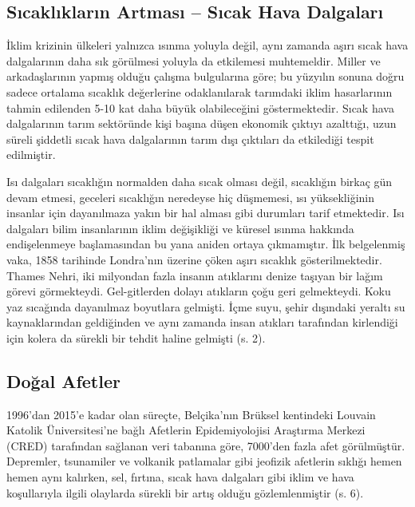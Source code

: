 \documentclass[
]{book}
\begin{document}
\hypertarget{sux131caklux131klarux131n-artmasux131-sux131cak-hava-dalgalarux131}{%
\subsection{Sıcaklıkların Artması -- Sıcak Hava Dalgaları}\label{sux131caklux131klarux131n-artmasux131-sux131cak-hava-dalgalarux131}}

İklim krizinin ülkeleri yalnızca ısınma yoluyla değil, aynı zamanda aşırı sıcak hava dalgalarının daha sık görülmesi yoluyla da etkilemesi muhtemeldir. Miller ve arkadaşlarının yapmış olduğu çalışma bulgularına göre; bu yüzyılın sonuna doğru sadece ortalama sıcaklık değerlerine odaklanılarak tarımdaki iklim hasarlarının tahmin edilenden 5-10 kat daha büyük olabileceğini göstermektedir. Sıcak hava dalgalarının tarım sektöründe kişi başına düşen ekonomik çıktıyı azalttığı, uzun süreli şiddetli sıcak hava dalgalarının tarım dışı çıktıları da etkilediği tespit edilmiştir. \citep{miller2021heat}

Isı dalgaları sıcaklığın normalden daha sıcak olması değil, sıcaklığın birkaç gün devam etmesi, geceleri sıcaklığın neredeyse hiç düşmemesi, ısı yüksekliğinin insanlar için dayanılmaza yakın bir hal alması gibi durumları tarif etmektedir. Isı dalgaları bilim insanlarının iklim değişikliği ve küresel ısınma hakkında endişelenmeye başlamasından bu yana aniden ortaya çıkmamıştır. İlk belgelenmiş vaka, 1858 tarihinde Londra'nın üzerine çöken aşırı sıcaklık gösterilmektedir. Thames Nehri, iki milyondan fazla insanın atıklarını denize taşıyan bir lağım görevi görmekteydi. Gel-gitlerden dolayı atıkların çoğu geri gelmekteydi. Koku yaz sıcağında dayanılmaz boyutlara gelmişti. İçme suyu, şehir dışındaki yeraltı su kaynaklarından geldiğinden ve aynı zamanda insan atıkları tarafından kirlendiği için kolera da sürekli bir tehdit haline gelmişti (s. 2). \citep{bush2020}

\hypertarget{doux11fal-afetler}{%
\subsection{Doğal Afetler}\label{doux11fal-afetler}}

1996'dan 2015'e kadar olan süreçte, Belçika'nın Brüksel kentindeki Louvain Katolik Üniversitesi'ne bağlı Afetlerin Epidemiyolojisi Araştırma Merkezi (CRED) tarafından sağlanan veri tabanına göre, 7000'den fazla afet görülmüştür. Depremler, tsunamiler ve volkanik patlamalar gibi jeofizik afetlerin sıklığı hemen hemen aynı kalırken, sel, fırtına, sıcak hava dalgaları gibi iklim ve hava koşullarıyla ilgili olaylarda sürekli bir artış olduğu gözlemlenmiştir (s. 6). \citep{bush2020}
\end{document}
